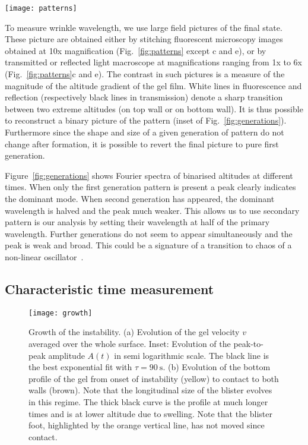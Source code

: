\documentclass[twocolumn,superscriptaddress,showpacs,preprintnumbers,
amsmath,amssymb,prl]{revtex4-1}
\begin{document}
\begin{figure*}
	\texttt{[image: patterns]}
	\caption{Patterns corresponding to the samples of Supplementary Table~\ref{tab:data} of the main text. (a-d) increasing cell thickness. (e-f) larger solid content. (g-i) increasing glycerol content. All pictures are stitching of fluorescent microscopy images except (c,e) which are details of reflected light macroscope images. The scale is common to all panels (scale bar \SI{1}{\milli\metre}). Length of arrows correspond to the measured primary wavelength.}
	\label{fig:patterns}
\end{figure*}

To measure wrinkle wavelength, we use large field pictures of the final state. These picture are obtained either by stitching fluorescent microscopy images obtained at 10x magnification (Fig.~\ref{fig:patterns} except c and e), or by transmitted or reflected light macroscope at magnifications ranging from 1x to 6x (Fig.~\ref{fig:patterns}c and e). The contrast in such pictures is a measure of the magnitude of the altitude gradient of the gel film. White lines in fluorescence and reflection (respectively black lines in transmission) denote a sharp transition between two extreme altitudes (on top wall or on bottom wall). It is thus possible to reconstruct a binary picture of the pattern (inset of Fig.~\ref{fig:generations}). Furthermore since the shape and size of a given generation of pattern do not change after formation, it is possible to revert the final picture to pure first generation.

Figure~\ref{fig:generations} shows Fourier spectra of binarised altitudes at different times. When only the first generation pattern is present a peak clearly indicates the dominant mode. When second generation has appeared, the dominant wavelength is halved and the peak much weaker. This allows us to use secondary pattern is our analysis by setting their wavelength at half of the primary wavelength. Further generations do not seem to appear simultaneously and the peak is weak and broad. This could be a signature of a transition to chaos of a non-linear oscillator~\cite{Brau2011}.

\subsection*{Characteristic time measurement}
\begin{figure}
	\texttt{[image: growth]}
	\caption{Growth of the instability. (a) Evolution of the gel velocity $v$ averaged over the whole surface. Inset: Evolution of the peak-to-peak amplitude $A(t)$ in semi logarithmic scale. The black line is the best exponential fit with $\tau=\SI{90}{\second}$. (b) Evolution of the bottom profile of the gel from onset of instability (yellow) to contact to both walls (brown). Note that the longitudinal size of the blister evolves in this regime. The thick black curve is the profile at much longer times and is at lower altitude due to swelling. Note that the blister foot, highlighted by the orange vertical line, has not moved since contact.}
	\label{fig:growth}
\end{figure}
\end{document}
